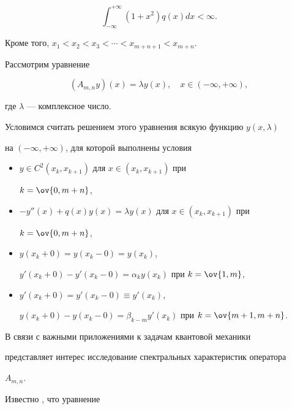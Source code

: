 $$ 


\int^{+\infty}_{-\infty}(1+x^2)q(x)dx<\infty. 


$$ 


Кроме того, $x_1<x_2<x_3<\dotsb<x_{m+n+1}<x_{m+n}$. 


 


Рассмотрим уравнение 


\begin{equation} 


(A_{m,n}y)(x)=\lambda y(x),\quad x\in(-\infty,+\infty), 


\end{equation} 


где $\lambda$ --- комплексное число. 


 


Условимся считать решением этого уравнения всякую функцию $y(x,\lambda)$ 


на $(-\infty,+\infty)$, для которой выполнены условия 


\begin{itemize} 


\item[1)] $y\in C^2(x_k,x_{k+1})$ для $x\in(x_k,x_{k+1})$ при 


$k=\ov{0,m+n}$, 


\item[2)] $-y''(x)+q(x)y(x)=\lambda y(x)$ для $x\in(x_k,x_{k+1})$ при 


$k=\ov{0,m+n}$, 


\item[3)] $y(x_k+0)=y(x_k-0)=y(x_k)$, 


$y'(x_k+0)-y'(x_k-0)=\alpha_k y(x_k)$ при $k=\ov{1,m}$, 


\item[4)] $y'(x_k+0)=y'(x_k-0)\equiv y'(x_k)$, 


$y(x_k+0)-y(x_k-0)=\beta_{k-m}y'(x_k)$ при $k=\ov{m+1,m+n}$. 


\end{itemize} 


В связи с важными приложениями к задачам квантовой механики \cite{1} 


представляет интерес исследование спектральных характеристик оператора 


$A_{m,n}$. 


 


Известно \cite{2}, что уравнение 


